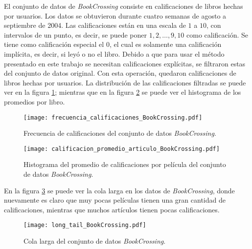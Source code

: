 El conjunto de datos de \textit{BookCrossing} consiste en  calificaciones de  libros hechas por  usuarios. Los datos se obtuvieron durante cuatro semanas de agosto a septiembre de 2004. Las calificaciones están en una escala de $1$ a $10$, con intervalos de un punto, es decir, se puede poner $1, 2, \hdots, 9, 10$ como calificación. Se tiene como calificación especial el $0$, el cual es solamente una calificación implícita, es decir, si leyó o no el libro. Debido a que para usar el método presentado en este trabajo se necesitan calificaciones explícitas, se filtraron estas del conjunto de datos original. Con esta operación, quedaron  calificaciones de  libros hechas por  usuarios. La distribución de las calificaciones filtradas se puede ver en la figura \ref{fig:BC_frec_calificaciones}; mientras que en la figura \ref{fig:BC_hist_prom_cals} se puede ver el histograma de los promedios por libro.

\begin{figure}[H]
	\centering
 	\texttt{[image: frecuencia\_calificaciones\_BookCrossing.pdf]}
 	\caption{Frecuencia de calificaciones del conjunto de datos \textit{BookCrossing}.}
 	\label{fig:BC_frec_calificaciones}
\end{figure}

\begin{figure}[H]
	\centering
 	\texttt{[image: calificacion\_promedio\_articulo\_BookCrossing.pdf]}
 	\caption{Histograma del promedio de calificaciones por película del conjunto de datos \textit{BookCrossing}.}
 	\label{fig:BC_hist_prom_cals}
\end{figure}

En la figura \ref{fig:BC_long_tail} se puede ver la cola larga en los datos de \textit{BookCrossing}, donde nuevamente es claro que muy pocas películas tienen una gran cantidad de calificaciones, mientras que muchos artículos tienen pocas calificaciones.

\begin{figure}[H]
	\centering
 	\texttt{[image: long\_tail\_BookCrossing.pdf]}
 	\caption{Cola larga del conjunto de datos \textit{BookCrossing}.}
 	\label{fig:BC_long_tail}
\end{figure}


